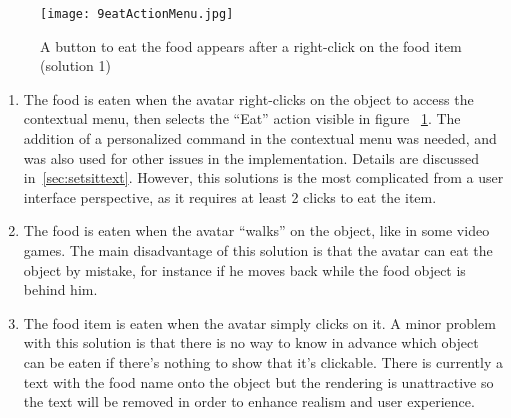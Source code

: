 \begin{figure}[h]
  \caption{A button to eat the food appears after a right-click on the food item (solution 1)}
  \centering
  \texttt{[image: 9eatActionMenu.jpg]}
  \label{fig:9eatActionMenu}
\end{figure}


\begin{enumerate}
\item The food is eaten when the avatar right-clicks on the object to access the contextual menu, then selects the ``Eat'' action visible in figure ~\ref{fig:9eatActionMenu}. The addition of a personalized command in the contextual menu was needed, and was also used for other issues in the implementation. Details are discussed in~\ref{sec:setsittext}. However, this solutions is the most complicated from a user interface perspective, as it requires at least 2 clicks to eat the item.
\item The food is eaten when the avatar ``walks'' on the object, like in some video games. The main disadvantage of this solution is that the avatar can eat the object by mistake, for instance if he moves back while the food object is behind him.
\item The food item is eaten when the avatar simply clicks on it. A minor problem with this solution is that there is no way to know in advance which object can be eaten if there's nothing to show that it's clickable. There is currently a text with the food name onto the object but the rendering is unattractive so the text will be removed in order to enhance realism and user experience.
\end{enumerate}

